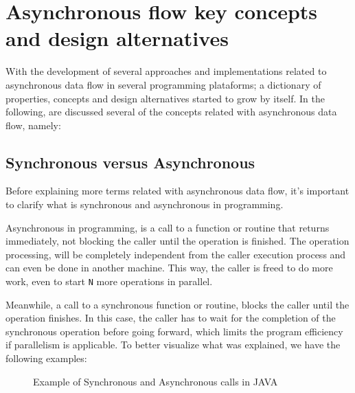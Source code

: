 
\section{Asynchronous flow key concepts and design alternatives} %
\label{sec:async_concepts}

With the development of several approaches and implementations related to asynchronous data flow in several programming plataforms; a dictionary
of properties, concepts and design alternatives started to grow by itself. In the following, are discussed several of the concepts related with asynchronous data flow, namely:

\subsection{Synchronous versus Asynchronous}
	Before explaining more terms related with asynchronous data flow, it's important to clarify what is synchronous and asynchronous in programming. 
	
	Asynchronous in programming, is a call to a function or routine that returns immediately, not blocking the caller until the operation is finished. The operation processing, will be completely independent from the caller execution process and can even be done in another machine. This way, the caller is freed to do more work, even to start \texttt{N} more operations in parallel. 
	
	Meanwhile, a call to a synchronous function or routine, blocks the caller until the operation finishes. In this case, the caller has to wait for the completion of the synchronous operation before going forward, which limits the program efficiency if parallelism is applicable.
	To better visualize what was explained, we have the following examples: 
	
	\begin{figure}[H]
		\centering
		\begin{subfigure}[h]{1.2\textwidth}
			\centering
			\label{fig:ra-vectorial}
		 \end{subfigure}	
	\qquad
		 \begin{subfigure}[h]{1.2\textwidth}
			\centering
			\label{fig:ra-raster}
		\end{subfigure}		
	  \caption{Example of Synchronous and Asynchronous calls in JAVA}
	  \label{fig:figura-completa}
	\end{figure}
	
